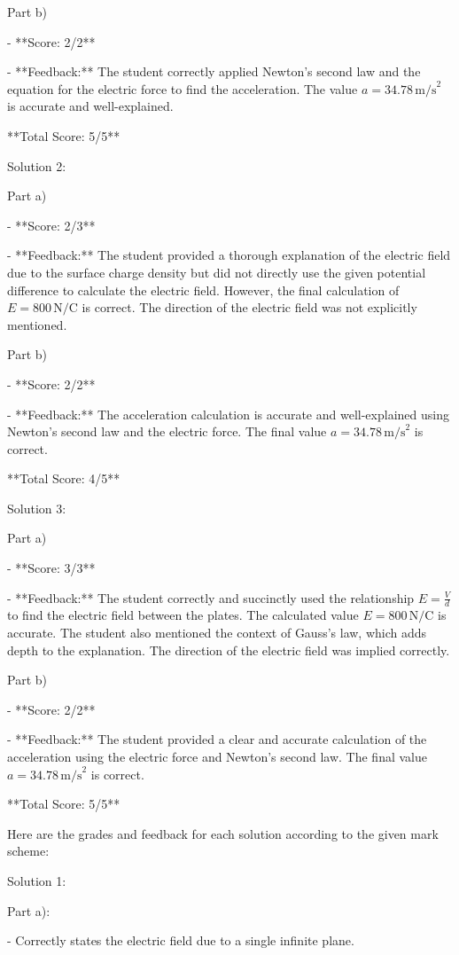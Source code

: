 \documentclass[a4paper,11pt]{article}
\begin{document}
Part b)

- **Score: 2/2**

- **Feedback:** The student correctly applied Newton’s second law and the equation for the electric force to find the acceleration. The value \( a = 34.78 \, \text{m/s}^2 \) is accurate and well-explained.

**Total Score: 5/5**

Solution 2:

Part a)

- **Score: 2/3**

- **Feedback:** The student provided a thorough explanation of the electric field due to the surface charge density but did not directly use the given potential difference to calculate the electric field. However, the final calculation of \(E = 800 \, \text{N/C}\) is correct. The direction of the electric field was not explicitly mentioned.

Part b)

- **Score: 2/2**

- **Feedback:** The acceleration calculation is accurate and well-explained using Newton’s second law and the electric force. The final value \( a = 34.78 \, \text{m/s}^2 \) is correct.

**Total Score: 4/5**

Solution 3:

Part a)

- **Score: 3/3**

- **Feedback:** The student correctly and succinctly used the relationship \(E = \frac{V}{d}\) to find the electric field between the plates. The calculated value \(E = 800 \, \text{N/C}\) is accurate. The student also mentioned the context of Gauss’s law, which adds depth to the explanation. The direction of the electric field was implied correctly.

Part b)

- **Score: 2/2**

- **Feedback:** The student provided a clear and accurate calculation of the acceleration using the electric force and Newton’s second law. The final value \( a = 34.78 \, \text{m/s}^2 \) is correct.

**Total Score: 5/5**




Here are the grades and feedback for each solution according to the given mark scheme:

Solution 1:

Part a):

- Correctly states the electric field due to a single infinite plane.
\end{document}
